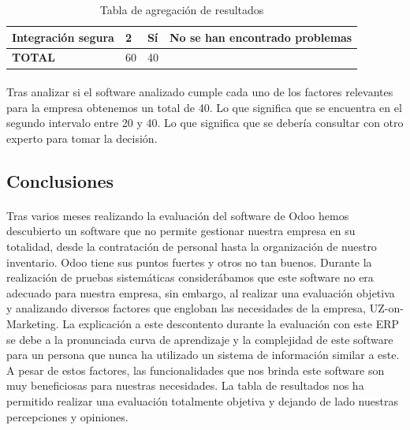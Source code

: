 \begin{table}
\begin{tabular}{|l|l|l|l|}
\hline
Integración segura      & 2             & Sí                & No se han encontrado problemas                                                                                                                                                                                                                                  \\ 
\hline
\textbf{TOTAL}          & 60            & 40                &                                                                                                                                                                                                                                                                 \\
\hline
\end{tabular}
\caption{Tabla de agregación de resultados}
\label{tabla-agre}
\end{table}

\paragraph{}
Tras analizar si el software analizado cumple cada uno de los factores relevantes para la empresa obtenemos un total de 40. Lo que significa que se encuentra en el segundo intervalo entre 20 y 40. Lo que significa que se debería consultar con otro experto para tomar la decisión. 
\subsection{Conclusiones}
\paragraph{}
Tras varios meses realizando la evaluación del software de Odoo hemos descubierto un software que no permite gestionar nuestra empresa en su totalidad, desde la contratación de personal hasta la organización de nuestro inventario. Odoo tiene sus puntos fuertes y otros no tan buenos. Durante la realización de pruebas sistemáticas considerábamos que este software no era adecuado para nuestra empresa, sin embargo, al realizar una evaluación objetiva y analizando diversos factores que engloban las necesidades de la empresa, UZ-on-Marketing. La explicación a este descontento durante la evaluación con este ERP se debe a la pronunciada curva de aprendizaje y la complejidad de este software para un persona que nunca ha utilizado un sistema de información similar a este. A pesar de estos factores, las funcionalidades que nos brinda este software son muy beneficiosas para nuestras necesidades. La tabla de resultados nos ha permitido realizar una evaluación totalmente objetiva y dejando de lado nuestras percepciones y opiniones.

